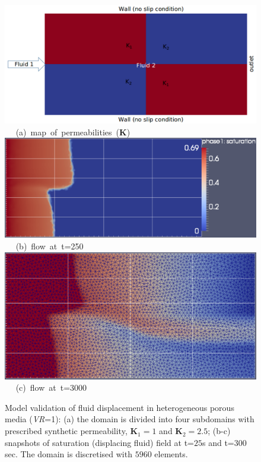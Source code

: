 \begin{figure}[ht] 
\vbox{
\hbox{\hspace{-0.3cm}
\includegraphics[width=.8\textwidth]{./Pics1/2b2_wi_fine/2b2_whole_in_fine_perm_1.pdf} 
}
\vspace{0.0cm}
\hbox{\hspace{3.5cm} (a) map of permeabilities ($\mathbf{K}$)
}
\vspace{0.25cm}
\hbox{\hspace{1.5cm}
\includegraphics[width=.85\textwidth]{./Pics1/2b2_wi_fine/2b2_whole_in_fine_250_2.pdf}
}
\vspace{0.0cm}
\hbox{\hspace{4.5cm} (b) flow at t=250 
}
\vspace{0.25cm}
\hbox{\hspace{1.5cm}
\includegraphics[width=.65\textwidth]{./Pics1/2b2_wi_fine/2b2_whole_in_fine_3000_2.pdf}
}
\vspace{0.0cm}
\hbox{\hspace{4.0cm} (c) flow at t=3000   
}}     
\caption{Model validation of fluid displacement in heterogeneous porous media ({\it VR}=1): (a) the domain is divided into four subdomains with prescribed synthetic permeability, $\mathbf{K}_{1}=1$ and $\mathbf{K}_{2}=2.5$; (b-c) snapshots of saturation (displacing fluid) field at t=$25$s and t=$300$ sec. The domain is discretised with $5960$  elements. }
\label{fem_cv_represent_a}
\end{figure}
\clearpage



